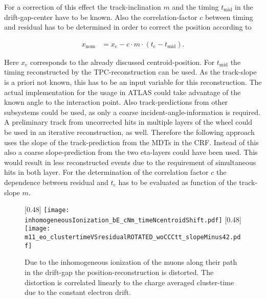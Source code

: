\documentclass[
twoside,            %
BCOR1.4cm,          %
10pt,               %
headings=normal,    %
headsepline,        %
clearplainpage,		%
final,              %
div=14,
open=right,
bibliography=toc
]{scrreprt}
\begin{document}
For a correction of this effect the track-inclination $m$ and the timing $t_{\mathrm{mid}}$ in the drift-gap-center have to be known.
Also the correlation-factor $c$ between timing and residual has to be determined in order to correct the position according to

\begin{align}
	x_{\mathrm{nom}} &= x_{\mathrm{c}} - c \cdot m \cdot \left( t_{\mathrm{c}} - t_{\mathrm{mid}} \right).
	\label{centroidCorrection}
\end{align} 

Here $x_{\mathrm{c}}$ corresponds to the already discussed centroid-position.
For $t_{\mathrm{mid}}$ the timing reconstructed by the \textmu TPC-reconstruction can be used.
As the track-slope is a priori not known, this has to be an input variable for this reconstruction.
The actual implementation for the usage in ATLAS could take advantage of the known angle to the interaction point.
Also track-predictions from other subsystems could be used, as only a coarse incident-angle-information is required.
A preliminary track from uncorrected hits in multiple layers of the wheel could be used in an iterative reconstruction, as well.
Therefore the following approach uses the slope of the track-prediction from the MDTs in the CRF.
Instead of this also a coarse slope-prediction from the two eta-layers could have been used.
This would result in less reconstructed events due to the requirement of simultaneous hits in both layer.
For the determination of the correlation factor $c$ the dependence between residual and $t_{\mathrm{c}}$ has to be evaluated as function of the track-slope $m$.

\begin{figure}[!h]
	\centering
	[0.48\textwidth]
	{\texttt{[image: inhomogeneousIonization\_bE\_cNm\_timeNcentroidShift.pdf]}}
	\hfill
	[0.48\textwidth]
	{\texttt{[image: m11\_eo\_clustertimeVSresidualROTATED\_woCCCtt\_slopeMinus42.pdf]}}
	\vspace{-2mm}
	\caption{
		Due to the inhomogeneous ionization of the muons along their path in the drift-gap the position-reconstruction is distorted.
		The distortion is correlated linearly to the charge averaged cluster-time due to the constant electron drift.
	}
\end{figure}
\end{document}
